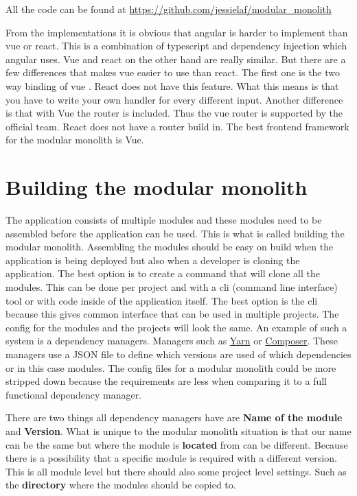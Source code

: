 All the code can be found at \url{https://github.com/jessielaf/modular_monolith}

From the implementations it is obvious that angular is harder to implement than vue or react. This is a combination of typescript and dependency injection which angular uses. Vue and react on the other hand are really similar. But there are a few differences that makes vue easier to use than react. The first one is the two way binding of vue \cite{vueTwoWay}. React does not have this feature. What this means is that you have to write your own handler for every different input. Another difference is that with Vue the router is included. Thus the vue router is supported by the official team. React does not have a router build in. The best frontend framework for the modular monolith is Vue.

\section{Building the modular monolith}
\label{sec:BuildingModularMonolith}

The application consists of multiple modules and these modules need to be assembled before the application can be used. This is what is called building the modular monolith. Assembling the modules should be easy on build when the application is being deployed but also when a developer is cloning the application. The best option is to create a command that will clone all the modules. This can be done per project and with a cli (command line interface) tool or with code inside of the application itself. The best option is the cli because this gives common interface that can be used in multiple projects. The config for the modules and the projects will look the same. An example of such a system is a dependency managers. Managers such as \href{https://yarnpkg.com/en/}{Yarn} or \href{https://getcomposer.org/}{Composer}. These managers use a JSON file to define which versions are used of which dependencies or in this case modules. The config files for a modular monolith could be more stripped down because the requirements are less when comparing it to a full functional dependency manager.

There are two things all dependency managers have are \textbf{Name of the module} and \textbf{Version}. What is unique to the modular monolith situation is that our name can be the same but where the module is \textbf{located} from can be different. Because there is a possibility that a specific module is required with a different version. This is all module level but there should also some project level settings. Such as the \textbf{directory} where the modules should be copied to.

